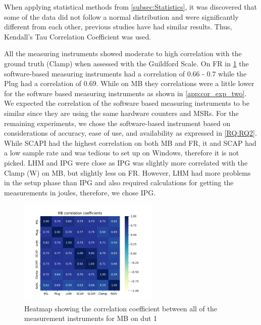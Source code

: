 When applying statistical methods from \cref{subsec:Statistics}, it was discovered that some of the data did not follow a normal distribution and were significantly different from each other, previous studies \cite{biksbois, Koedijk2022diff} have had similar results. Thus, Kendall's Tau Correlation Coefficient was used.%



All the measuring instruments showed moderate to high correlation with the ground truth (Clamp) when assessed with the Guildford Scale. On FR in \cref{fig:mandelCorrDut1} the software-based measuring instruments had a correlation of $0.66$ - $0.7$ while the Plug had a correlation of $0.69$. While on MB they correlations were a little lower for the software based measuring instruments as shown in \cref{app:cor_exp_two}. We expected the correlation of the software based measuring instruments to be similar since they are using the same hardware counters and MSRs. For the remaining experiments, we chose the software-based instrument based on considerations of accuracy, ease of use, and availability as expressed in \cref{RQ:RQ2}. While SCAPI had the highest correlation on both MB and FR, it and SCAP had a low sample rate and was tedious to set up on Windows, therefore it is not picked. LHM and IPG were close as IPG was slightly more correlated with the Clamp (W) on MB, but slightly less on FR. However, LHM had more problems in the setup phase than IPG and also required calculations for getting the measurements in joules, therefore, we chose IPG. %
\begin{figure}[H]
    \centering
    \hspace*{-1cm} %
    \includegraphics[width=0.6\textwidth]{figures/MandelbrotDut1.png}
    \caption{Heatmap showing the correlation coefficient between all of the measurement instruments for MB on dut 1}
    \label{fig:mandelCorrDut1}
\end{figure}
